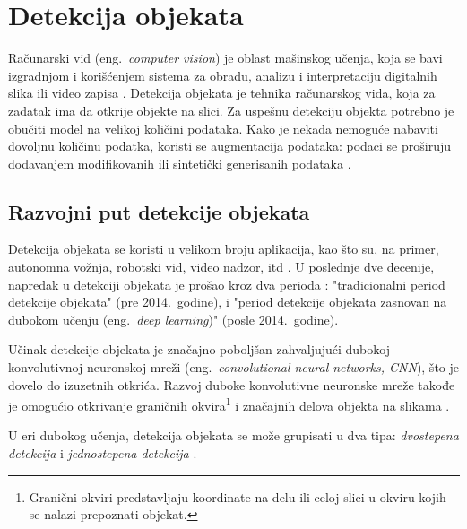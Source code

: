 \documentclass[12pt,oneside]{memoir}
\begin{document}
\chapter{Detekcija objekata}
\label{section2}
Računarski vid (eng.~\textit{computer vision}) je oblast mašinskog učenja, koja se bavi izgradnjom i korišćenjem  sistema za obradu, analizu i interpretaciju digitalnih slika ili video zapisa \cite{ballard1982computer, huang1996computer}.
Detekcija objekata je tehnika računarskog vida, koja za zadatak ima 
da otkrije objekte na slici. Za uspešnu detekciju objekta potrebno je obučiti model na velikoj količini podataka. 
Kako je nekada nemoguće nabaviti dovoljnu količinu podatka, koristi se augmentacija podataka: podaci se proširuju dodavanjem modifikovanih ili sintetički generisanih podataka \cite{shorten2019survey}. 


\section{Razvojni put detekcije objekata}
\label{section2_detekcijaobjekta}


Detekcija objekata se koristi u velikom broju aplikacija, kao što su, na primer, autonomna vožnja, robotski vid, video nadzor, itd \cite{zou2019object}. U poslednje dve decenije, napredak u detekciji objekata je prošao kroz dva perioda \cite{zou2019object}: "tradicionalni period detekcije objekata" (pre 2014.~godine), i "period detekcije objekata zasnovan na dubokom učenju (eng.~\textit{deep learning})" (posle 2014.~godine).


Učinak detekcije objekata je značajno poboljšan zahvaljujući dubokoj konvolutivnoj neuronskoj mreži (eng.~\textit{convolutional neural networks, CNN}), što je dovelo do izuzetnih otkrića.
Razvoj duboke konvolutivne neuronske mreže takođe je omogućio otkrivanje graničnih okvira\footnote{Granični okviri predstavljaju koordinate na delu ili celoj slici u okviru kojih se nalazi prepoznati objekat.} i značajnih delova objekta na slikama \cite{girshick2014rich, ren2015faster, kang2017t, amit2020object}.


U eri dubokog učenja, detekcija objekata se može grupisati u dva tipa: \textit{dvostepena detekcija} i \textit{jednostepena detekcija}  \cite{zou2019object}.
\end{document}
